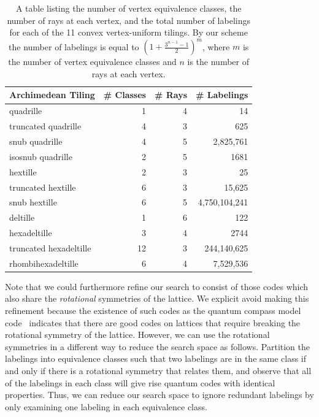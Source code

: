\documentclass{amsbook}
\theoremstyle{plain}
\theoremstyle{definition}
\theoremstyle{remark}
\newcommand{\paren}[1]{\left(#1\right)}
\begin{document}
\begin{table}
\begin{tabular}{lrrr} \toprule
Archimedean Tiling & \# Classes & \# Rays & \# Labelings \\ \midrule
quadrille & 1 & 4 & 14\\
truncated quadrille & 4 & 3 & 625\\
snub quadrille & 4 & 5 & 2,825,761\\
isosnub quadrille & 2 & 5 & 1681\\
hextille & 2 & 3 & 25\\
truncated hextille & 6 & 3 & 15,625\\
snub hextille & 6 & 5 & 4,750,104,241\\
deltille & 1 & 6 & 122\\
hexadeltille & 3 & 4 & 2744\\
truncated hexadeltille & 12 & 3 & 244,140,625\\
rhombihexadeltille & 6 & 4 & 7,529,536\\ \bottomrule
\end{tabular}
\caption[Combinatorics of the tilings]{
\label{table:combinatorics}
A table listing the number of vertex equivalence classes, the number of rays at each vertex, and the total number of labelings for each of the 11 convex vertex-uniform tilings.  By our scheme the number of labelings is equal to $\paren{1+\frac{3^{n-1}-1}{2}}^m$, where $m$ is the number of vertex equivalence classes and $n$ is the number of rays at each vertex.}
\end{table}

Note that we could furthermore refine our search to consist of those codes which also share the \emph{rotational} symmetries of the lattice.  We explicit avoid making this refinement because the existence of such codes as the quantum compass model code~\cite{Bacon:06a} indicates that there are good codes on lattices that require breaking the rotational symmetry of the lattice.  However, we can use the rotational symmetries in a different way to reduce the search space as follows.  Partition the labelings into equivalence classes such that two labelings are in the same class if and only if there is a rotational symmetry that relates them, and observe that all of the labelings in each class will give rise quantum codes with identical properties.  Thus, we can reduce our search space to ignore redundant labelings by only examining one labeling in each equivalence class.
\end{document}
